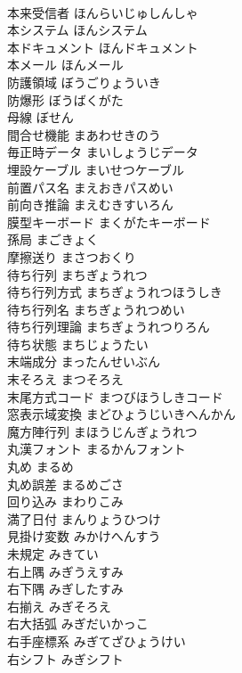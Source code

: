 \documentclass[8pt]{extreport}
\begin{document}
\begin{CJK}{UTF8}{min}
\\	本来受信者	ほんらいじゅしんしゃ	
\\	本システム	ほんシステム	
\\	本ドキュメント	ほんドキュメント	
\\	本メール	ほんメール	
\\	防護領域	ぼうごりょういき	
\\	防爆形	ぼうばくがた	
\\	母線	ぼせん	
\\	間合せ機能	まあわせきのう	
\\	毎正時データ	まいしょうじデータ	
\\	埋設ケーブル	まいせつケーブル	
\\	前置パス名	まえおきパスめい	
\\	前向き推論	まえむきすいろん	
\\	膜型キーボード	まくがたキーボード	
\\	孫局	まごきょく	
\\	摩擦送り	まさつおくり	
\\	待ち行列	まちぎょうれつ	
\\	待ち行列方式	まちぎょうれつほうしき	
\\	待ち行列名	まちぎょうれつめい	
\\	待ち行列理論	まちぎょうれつりろん	
\\	待ち状態	まちじょうたい	
\\	末端成分	まったんせいぶん	
\\	末そろえ	まつそろえ	
\\	末尾方式コード	まつびほうしきコード	
\\	窓表示域変換	まどひょうじいきへんかん	
\\	魔方陣行列	まほうじんぎょうれつ	
\\	丸漢フォント	まるかんフォント	
\\	丸め	まるめ	
\\	丸め誤差	まるめごさ	
\\	回り込み	まわりこみ	
\\	満了日付	まんりょうひつけ	
\\	見掛け変数	みかけへんすう	
\\	未規定	みきてい	
\\	右上隅	みぎうえすみ	
\\	右下隅	みぎしたすみ	
\\	右揃え	みぎそろえ	
\\	右大括弧	みぎだいかっこ	
\\	右手座標系	みぎてざひょうけい	
\\	右シフト	みぎシフト	

\end{CJK}
\end{document}
